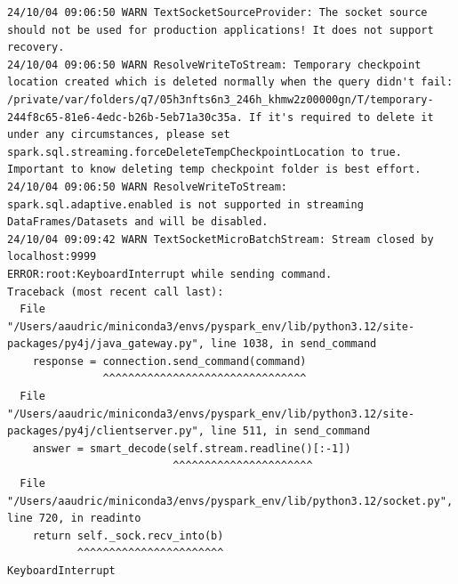 \documentclass[
  letterpaper,
  DIV=11,
  numbers=noendperiod]{scrartcl}
\begin{document}
\begin{verbatim}
24/10/04 09:06:50 WARN TextSocketSourceProvider: The socket source should not be used for production applications! It does not support recovery.
24/10/04 09:06:50 WARN ResolveWriteToStream: Temporary checkpoint location created which is deleted normally when the query didn't fail: /private/var/folders/q7/05h3nfts6n3_246h_khmw2z00000gn/T/temporary-244f8c65-81e6-4edc-b26b-5eb71a30c35a. If it's required to delete it under any circumstances, please set spark.sql.streaming.forceDeleteTempCheckpointLocation to true. Important to know deleting temp checkpoint folder is best effort.
24/10/04 09:06:50 WARN ResolveWriteToStream: spark.sql.adaptive.enabled is not supported in streaming DataFrames/Datasets and will be disabled.
24/10/04 09:09:42 WARN TextSocketMicroBatchStream: Stream closed by localhost:9999
ERROR:root:KeyboardInterrupt while sending command.
Traceback (most recent call last):
  File "/Users/aaudric/miniconda3/envs/pyspark_env/lib/python3.12/site-packages/py4j/java_gateway.py", line 1038, in send_command
    response = connection.send_command(command)
               ^^^^^^^^^^^^^^^^^^^^^^^^^^^^^^^^
  File "/Users/aaudric/miniconda3/envs/pyspark_env/lib/python3.12/site-packages/py4j/clientserver.py", line 511, in send_command
    answer = smart_decode(self.stream.readline()[:-1])
                          ^^^^^^^^^^^^^^^^^^^^^^
  File "/Users/aaudric/miniconda3/envs/pyspark_env/lib/python3.12/socket.py", line 720, in readinto
    return self._sock.recv_into(b)
           ^^^^^^^^^^^^^^^^^^^^^^^
KeyboardInterrupt
\end{verbatim}
\end{document}
